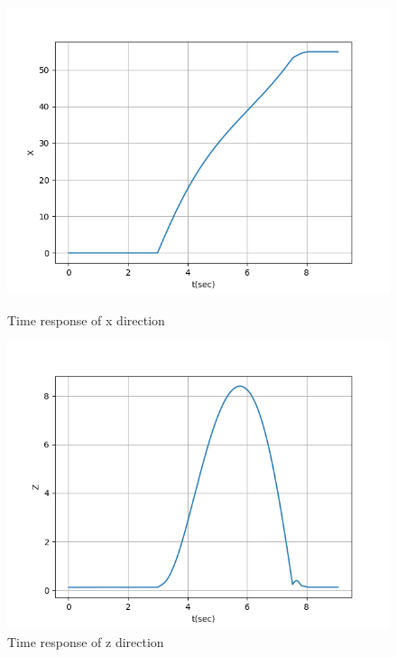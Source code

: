 \documentclass{beamer}
\begin{document}
    \begin{frame}{\secname}
        \begin{figure}
            \begin{multicols}{2}
                \includegraphics[width=\linewidth]{Figs/x.png}
                \caption{Time response of x direction}
                \columnbreak

                \includegraphics[width=\linewidth]{Figs/z.png}
                \caption{Time response of z direction}
            \end{multicols}
        \end{figure}
    \end{frame}
\end{document}

